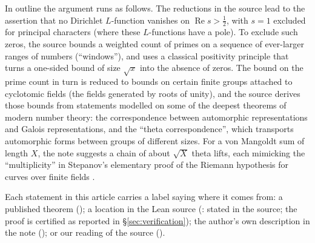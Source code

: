 In outline the argument runs as follows. The reductions in the source lead to the assertion that no
Dirichlet $L$-function vanishes on $\operatorname{Re}s>\tfrac12$, with $s=1$ excluded for principal
characters (where these $L$-functions have a pole). To exclude such zeros, the source bounds a weighted count of primes on a sequence of
ever-larger ranges of numbers (``windows''), and uses a classical positivity principle that turns a
one-sided bound of size $\sqrt{x}$ into the absence of zeros. The bound on the prime count in turn
is reduced to bounds on certain finite groups attached to cyclotomic fields (the fields generated by
roots of unity), and the source derives those bounds from statements modelled on some of the
deepest theorems of modern number theory: the correspondence between automorphic representations and Galois representations, and the
``theta correspondence'', which transports automorphic forms between groups of different sizes. For
a von Mangoldt sum of length $X$, the note suggests a chain of about $\sqrt{X}$ theta lifts, each
mimicking the ``multiplicity'' in Stepanov's elementary proof of the Riemann hypothesis for curves
over finite fields  .

Each statement in this article carries a label saying where it comes from: a published theorem
(); a location in the Lean source (: stated in the source; the proof is
certified as reported in \S\ref{sec:verification}); the author's own description in
the note (); or our reading of the source ().
